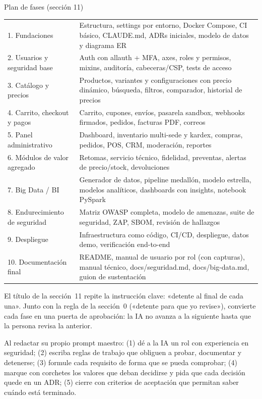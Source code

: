 \documentclass[stu,12pt,floatsintext]{apa7}
\begin{document}
\begin{fragmento}[label=f:fases]{Plan de fases (sección 11)}
\begin{tabular}{@{}p{4.6cm}p{9.6cm}@{}}
1. Fundaciones & Estructura, settings por entorno, Docker Compose, CI básico, CLAUDE.md, ADRs iniciales, modelo de datos y diagrama ER \\
2. Usuarios y seguridad base & Auth con allauth + MFA, axes, roles y permisos, mixins, auditoría, cabeceras/CSP, tests de acceso \\
3. Catálogo y precios & Productos, variantes y configuraciones con precio dinámico, búsqueda, filtros, comparador, historial de precios \\
4. Carrito, checkout y pagos & Carrito, cupones, envíos, pasarela sandbox, webhooks firmados, pedidos, facturas PDF, correos \\
5. Panel administrativo & Dashboard, inventario multi-sede y kardex, compras, pedidos, POS, CRM, moderación, reportes \\
6. Módulos de valor agregado & Retomas, servicio técnico, fidelidad, preventas, alertas de precio/stock, devoluciones \\
7. Big Data / BI & Generador de datos, pipeline medallón, modelo estrella, modelos analíticos, dashboards con insights, notebook PySpark \\
8. Endurecimiento de seguridad & Matriz OWASP completa, modelo de amenazas, suite de seguridad, ZAP, SBOM, revisión de hallazgos \\
9. Despliegue & Infraestructura como código, CI/CD, despliegue, datos demo, verificación end-to-end \\
10. Documentación final & README, manual de usuario por rol (con capturas), manual técnico, docs/seguridad.md, docs/big-data.md, guion de sustentación \\
\end{tabular}
\end{fragmento}

El título de la sección~11 repite la instrucción clave: «detente al final de cada una». Junto con la
regla de la sección~0 («detente para que yo revise»), convierte cada fase en una puerta de aprobación:
la IA no avanza a la siguiente hasta que la persona revisa la anterior.

\begin{leccion}
Al redactar su propio prompt maestro: (1) dé a la IA un rol con experiencia en seguridad; (2) escriba
reglas de trabajo que obliguen a probar, documentar y detenerse; (3) formule cada requisito de forma
que se pueda comprobar; (4) marque con corchetes los valores que deban decidirse y pida que cada
decisión quede en un ADR; (5) cierre con criterios de aceptación que permitan saber cuándo está
terminado.
\end{leccion}
\end{document}
